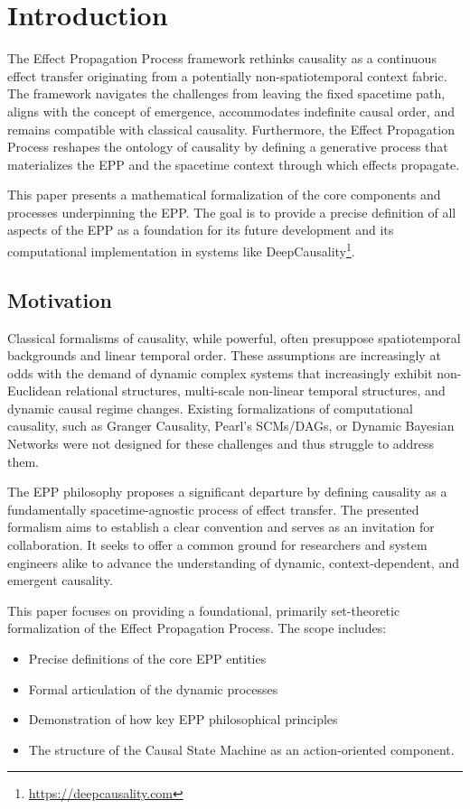 
\section{Introduction}
\label{sec:formalization_introduction}

The Effect Propagation Process framework rethinks causality as a continuous effect transfer originating from a potentially non-spatiotemporal context fabric. The framework navigates the challenges from leaving the fixed spacetime path, aligns with the concept of emergence, accommodates indefinite causal order, and remains compatible with classical causality. Furthermore, the Effect Propagation Process reshapes the ontology of causality by defining a generative process that materializes the EPP and the spacetime context through which effects propagate.

This paper presents a mathematical formalization of the core components and processes underpinning the EPP. The goal is to provide a precise definition of all aspects of the EPP as a foundation for its future development and its computational implementation in systems like DeepCausality\footnote{\url{https://deepcausality.com}}.

\subsection{Motivation}
\label{sec:formal_intro_motivation}

Classical formalisms of causality, while powerful, often presuppose spatiotemporal backgrounds and linear temporal order. 
These assumptions are increasingly at odds with the demand of dynamic complex systems that increasingly exhibit
non-Euclidean relational structures, multi-scale non-linear temporal structures, and dynamic causal regime changes. 
Existing formalizations of computational causality, such as Granger Causality, Pearl's SCMs/DAGs, or Dynamic Bayesian Networks
were not designed for these challenges and thus struggle to address them. 

The EPP philosophy proposes a significant departure by defining causality as a fundamentally spacetime-agnostic process of effect transfer. The presented formalism aims to establish a clear convention and serves as an invitation for collaboration. It seeks to offer a common ground for researchers and system engineers alike to advance the understanding of dynamic, context-dependent, and emergent causality.

This paper focuses on providing a foundational, primarily set-theoretic formalization of the Effect Propagation Process. The scope includes:
\begin{itemize}
    \setlength\itemsep{0em}
    \item Precise definitions of the core EPP entities
    \item Formal articulation of the dynamic processes
    \item Demonstration of how key EPP philosophical principles
    \item The structure of the Causal State Machine as an action-oriented component.
\end{itemize}

